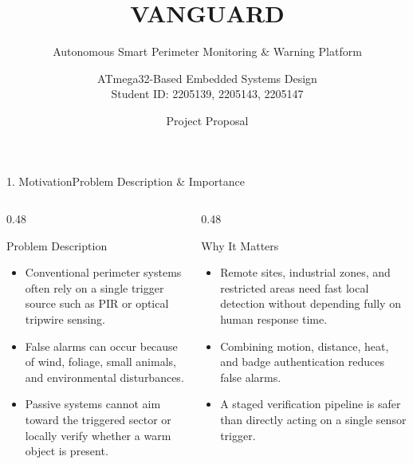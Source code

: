 \documentclass[aspectratio=169, 10pt]{beamer}
\title{VANGUARD}
\subtitle{Autonomous Smart Perimeter Monitoring \& Warning Platform}
\author{ATmega32-Based Embedded Systems Design \\ Student ID: 2205139, 2205143, 2205147}
\date{Project Proposal}
\begin{document}
\begin{frame}
    \titlepage
\end{frame}

\begin{frame}{1. Motivation}{Problem Description \& Importance}
    \begin{columns}[T]
        \begin{column}{0.48\textwidth}
            \begin{block}{Problem Description}
                \small
                \begin{itemize}
                    \item Conventional perimeter systems often rely on a single trigger source such as PIR or optical tripwire sensing.
                    \item False alarms can occur because of wind, foliage, small animals, and environmental disturbances.
                    \item Passive systems cannot aim toward the triggered sector or locally verify whether a warm object is present.
                \end{itemize}
            \end{block}
        \end{column}
        \begin{column}{0.48\textwidth}
            \begin{block}{Why It Matters}
                \small
                \begin{itemize}
                    \item Remote sites, industrial zones, and restricted areas need fast local detection without depending fully on human response time.
                    \item Combining motion, distance, heat, and badge authentication reduces false alarms.
                    \item A staged verification pipeline is safer than directly acting on a single sensor trigger.
                \end{itemize}
            \end{block}
        \end{column}
    \end{columns}
\end{frame}
\end{document}
